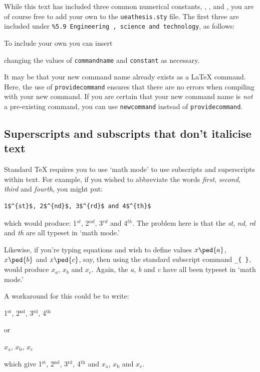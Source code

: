 While this text has included three common numerical constants, \eu{}, \iu{}, and \ju{}, you are of course free to add your own to the \verb|ueathesis.sty| file. The first three are included under \verb|%5.9 Engineering , science and technology|, as follows:
\begin{spverbatim}
\providecommand*{\eu}{\ensuremath{\mathrm{e}}}
\end{spverbatim}
To include your own you can insert
\begin{spverbatim}
\providecommand*{\commandname]}{\ensuremath{\mathrm{constant}}}
\end{spverbatim}
changing the values of \verb|commandname| and \verb|constant| as necessary.

\begin{remark}
It may be that your new command name already exists as a \LaTeX{} command. Here, the use of \verb|providecommand| ensures that there are no errors when compiling with your new command. If you are certain that your new command name is \emph{not} a pre-existing command, you can use \verb|newcommand| instead of \verb|providecommand|.
\end{remark}
\subsection{Superscripts and subscripts that don't italicise text}
Standard \TeX{} requires you to use ‘math mode’ to use subscripts and superscripts within text. For example, if you wished to abbreviate the words \emph{first}, \emph{second}, \emph{third} and \emph{fourth}, you might put:
\begin{verbatim}
1$^{st}$, 2$^{nd}$, 3$^{rd}$ and 4$^{th}$
\end{verbatim}
which would produce: 1$^{st}$, 2$^{nd}$, 3$^{rd}$ and 4$^{th}$. The problem here is that the \emph{st}, \emph{nd}, \emph{rd} and \emph{th} are all typeset in ‘math mode.’ 

Likewise, if you're typing equations and wish to define values $x\ped{a}$, $x\ped{b}$ and $x\ped{c}$, say, then using the standard subscript command \verb|_{ }|, would produce $x_a$, $x_b$ and $x_c$. Again, the \emph{a}, \emph{b} and \emph{c} have all been typeset in ‘math mode.’

A workaround for this could be to write:
\begin{spverbatim}
1$^{\text{st}}$, 2$^{\text{nd}}$, 3$^{\text{rd}}$, 4$^{\text{th}}$
\end{spverbatim}
or 
\begin{spverbatim}
$x_{\text{a}}$, $x_{\text{b}}$, $x_{\text{c}}$
\end{spverbatim}
which give 1$^{\text{st}}$, 2$^{\text{nd}}$, 3$^{\text{rd}}$, 4$^{\text{th}}$ and $x_{\text{a}}$, $x_{\text{b}}$ and $x_{\text{c}}$.

